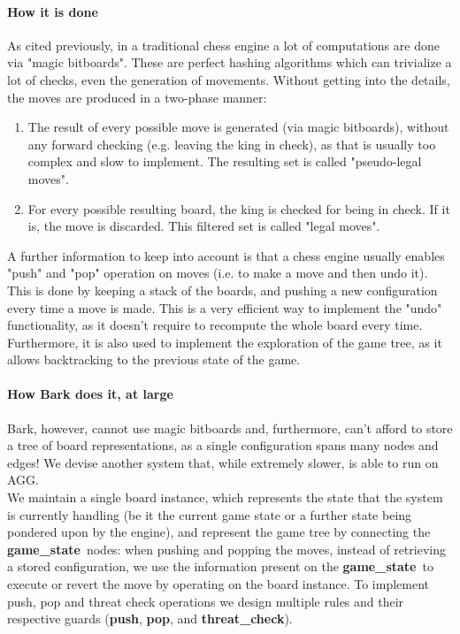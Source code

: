 \documentclass[a4paper, 10pt]{scrartcl}
\newcommand{\noderepr}[1]{\textsf{\textbf{#1}}}
\newcommand{\gamestate}{\noderepr{game\_state}}
\newcommand{\push}{\noderepr{push}}
\newcommand{\pop}{\noderepr{pop}}
\newcommand{\threatcheck}{\noderepr{threat\_check}}
\begin{document}
    \paragraph*{How it is done} As cited previously, in a traditional chess engine a lot of computations are done via "magic bitboards". These are perfect hashing algorithms which can trivialize a lot of checks, even the generation of movements. Without getting into the details, the moves are produced in a two-phase manner:
    \begin{enumerate}
        \item The result of every possible move is generated (via magic bitboards), without any forward checking (e.g. leaving the king in check), as that is usually too complex and slow to implement. The resulting set is called "pseudo-legal moves".
        \item For every possible resulting board, the king is checked for being in check. If it is, the move is discarded. This filtered set is called "legal moves".
    \end{enumerate}
    A further information to keep into account is that a chess engine usually enables "push" and "pop" operation on moves (i.e. to make a move and then undo it). This is done by keeping a stack of the boards, and pushing a new configuration every time a move is made. This is a very efficient way to implement the "undo" functionality, as it doesn't require to recompute the whole board every time. Furthermore, it is also used to implement the exploration of the game tree, as it allows backtracking to the previous state of the game.

    \paragraph*{How Bark does it, at large} Bark, however, cannot use magic bitboards and, furthermore, can't afford to store a tree of board representations, as a single configuration spans many nodes and edges! We devise another system that, while extremely slower, is able to run on AGG.\\ We maintain a single board instance, which represents the state that the system is currently handling (be it the current game state or a further state being pondered upon by the engine), and represent the game tree by connecting the \gamestate\ nodes: when pushing and popping the moves, instead of retrieving a stored configuration, we use the information present on the \gamestate\ to execute or revert the move by operating on the board instance.
    To implement push, pop and threat check operations we design multiple rules and their respective guards (\push, \pop, and \threatcheck).
\end{document}
